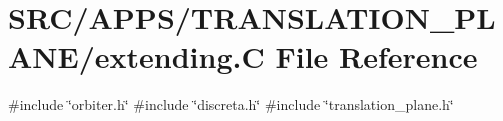 \hypertarget{extending_8_c}{}\section{S\+R\+C/\+A\+P\+P\+S/\+T\+R\+A\+N\+S\+L\+A\+T\+I\+O\+N\+\_\+\+P\+L\+A\+N\+E/extending.C File Reference}
\label{extending_8_c}
{\ttfamily \#include \char`\"{}orbiter.\+h\char`\"{}}\newline
{\ttfamily \#include \char`\"{}discreta.\+h\char`\"{}}\newline
{\ttfamily \#include \char`\"{}translation\+\_\+plane.\+h\char`\"{}}\newline
